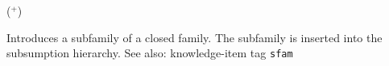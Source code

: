    ($^+$)

Introduces a subfamily of a closed family. The subfamily is inserted into the subsumption hierarchy.
See also: knowledge-item tag {\tt sfam}



